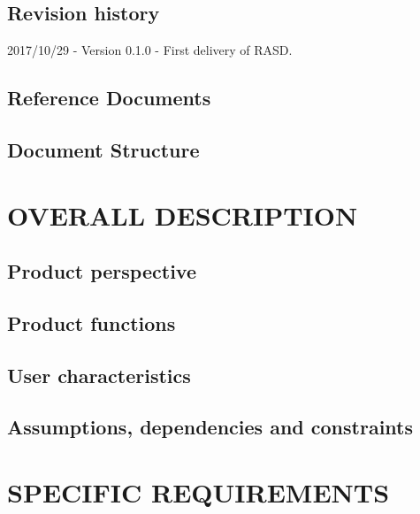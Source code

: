 \documentclass[11pt]{report}
\begin{document}
		\section{Revision history}
		\label{sect:Revision history}
			2017/10/29 - Version 0.1.0 - First delivery of RASD.
			
		\section{Reference Documents}
		\label{sect:Documents}
			
			
		\section{Document Structure}
		\label{sect:Document Structure}
			
			
	\chapter{OVERALL DESCRIPTION}
	\label{ch:OVERALL DESCRIPTION}
	
		\section{Product perspective}
		\label{sect:Product perspective}
			
		\section{Product functions}
		\label{sect:Product functions}
			
			
		\section{User characteristics}
		\label{sect:User characteristics}
			
		\section{Assumptions, dependencies and constraints}
		\label{sect:Assumptions, dependencies and constraints}
			
	\chapter{SPECIFIC REQUIREMENTS}
	\label{ch:SPECIFIC REQUIREMENTS}
	
\end{document}
